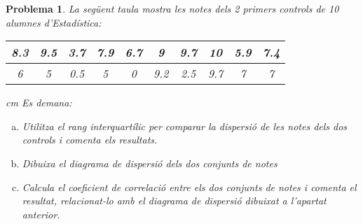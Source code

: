 \documentclass[a4paper,12pt]{article}
\newcounter{prbcont}
\newtheorem{problema}[prbcont]{Problema}
\begin{document}
\vskip 0.5cm

\begin{problema}
La següent taula mostra les notes dels 2 primers controls de 10 alumnes d'Estadística:



\begin{center}
\begin{tabular}{|cccccccccc|}
\hline
 8.3 & 9.5 & 3.7 & 7.9 & 6.7 & 9 & 9.7 & 10 & 5.9 & 7.4  \\
\hline
6 & 5 & 0.5 & 5 & 0 & 9.2 & 2.5 & 9.7 & 7 & 7  \\
\hline
\end{tabular}
\end{center}


 cm
Es demana:

\begin{enumerate}[a)]
\item Utilitza el rang interquartílic per comparar la dispersió de les notes dels dos controls i comenta els resultats.
\item Dibuixa el diagrama de dispersió dels dos conjunts de notes
\item Calcula el coeficient de correlació entre els dos conjunts de notes i comenta el resultat, relacionat-lo amb el diagrama
de dispersió dibuixat a l'apartat anterior.
\end{enumerate}
\end{problema}

\vskip 0.5cm
\end{document}

